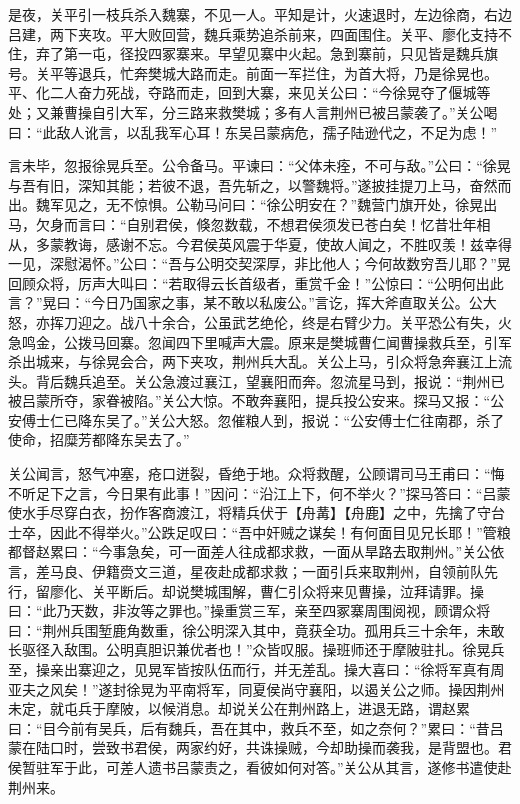 是夜，关平引一枝兵杀入魏寨，不见一人。平知是计，火速退时，左边徐商，右边吕建，两下夹攻。平大败回营，魏兵乘势追杀前来，四面围住。关平、廖化支持不住，弃了第一屯，径投四冢寨来。早望见寨中火起。急到寨前，只见皆是魏兵旗号。关平等退兵，忙奔樊城大路而走。前面一军拦住，为首大将，乃是徐晃也。平、化二人奋力死战，夺路而走，回到大寨，来见关公曰：“今徐晃夺了偃城等处；又兼曹操自引大军，分三路来救樊城；多有人言荆州已被吕蒙袭了。”关公喝曰：“此敌人讹言，以乱我军心耳！东吴吕蒙病危，孺子陆逊代之，不足为虑！”

言未毕，忽报徐晃兵至。公令备马。平谏曰：“父体未痊，不可与敌。”公曰：“徐晃与吾有旧，深知其能；若彼不退，吾先斩之，以警魏将。”遂披挂提刀上马，奋然而出。魏军见之，无不惊惧。公勒马问曰：“徐公明安在？”魏营门旗开处，徐晃出马，欠身而言曰：“自别君侯，倏忽数载，不想君侯须发已苍白矣！忆昔壮年相从，多蒙教诲，感谢不忘。今君侯英风震于华夏，使故人闻之，不胜叹羡！兹幸得一见，深慰渴怀。”公曰：“吾与公明交契深厚，非比他人；今何故数穷吾儿耶？”晃回顾众将，厉声大叫曰：“若取得云长首级者，重赏千金！”公惊曰：“公明何出此言？”晃曰：“今日乃国家之事，某不敢以私废公。”言讫，挥大斧直取关公。公大怒，亦挥刀迎之。战八十余合，公虽武艺绝伦，终是右臂少力。关平恐公有失，火急鸣金，公拨马回寨。忽闻四下里喊声大震。原来是樊城曹仁闻曹操救兵至，引军杀出城来，与徐晃会合，两下夹攻，荆州兵大乱。关公上马，引众将急奔襄江上流头。背后魏兵追至。关公急渡过襄江，望襄阳而奔。忽流星马到，报说：“荆州已被吕蒙所夺，家眷被陷。”关公大惊。不敢奔襄阳，提兵投公安来。探马又报：“公安傅士仁已降东吴了。”关公大怒。忽催粮人到，报说：“公安傅士仁往南郡，杀了使命，招糜芳都降东吴去了。”

关公闻言，怒气冲塞，疮口迸裂，昏绝于地。众将救醒，公顾谓司马王甫曰：“悔不听足下之言，今日果有此事！”因问：“沿江上下，何不举火？”探马答曰：“吕蒙使水手尽穿白衣，扮作客商渡江，将精兵伏于【舟冓】【舟鹿】之中，先擒了守台士卒，因此不得举火。”公跌足叹曰：“吾中奸贼之谋矣！有何面目见兄长耶！”管粮都督赵累曰：“今事急矣，可一面差人往成都求救，一面从旱路去取荆州。”关公依言，差马良、伊籍赍文三道，星夜赴成都求救；一面引兵来取荆州，自领前队先行，留廖化、关平断后。却说樊城围解，曹仁引众将来见曹操，泣拜请罪。操曰：“此乃天数，非汝等之罪也。”操重赏三军，亲至四冢寨周围阅视，顾谓众将曰：“荆州兵围堑鹿角数重，徐公明深入其中，竟获全功。孤用兵三十余年，未敢长驱径入敌围。公明真胆识兼优者也！”众皆叹服。操班师还于摩陂驻扎。徐晃兵至，操亲出寨迎之，见晃军皆按队伍而行，并无差乱。操大喜曰：“徐将军真有周亚夫之风矣！”遂封徐晃为平南将军，同夏侯尚守襄阳，以遏关公之师。操因荆州未定，就屯兵于摩陂，以候消息。却说关公在荆州路上，进退无路，谓赵累曰：“目今前有吴兵，后有魏兵，吾在其中，救兵不至，如之奈何？”累曰：“昔吕蒙在陆口时，尝致书君侯，两家约好，共诛操贼，今却助操而袭我，是背盟也。君侯暂驻军于此，可差人遗书吕蒙责之，看彼如何对答。”关公从其言，遂修书遣使赴荆州来。

